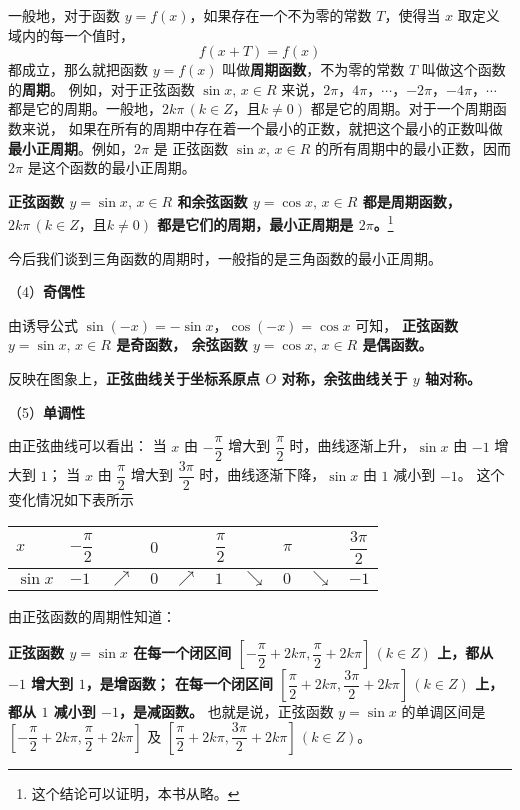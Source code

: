 一般地，对于函数 $y = f(x)$，如果存在一个不为零的常数 $T$，使得当 $x$ 取定义域内的每一个值时，
$$f(x + T) = f(x)$$
都成立，那么就把函数 $y = f(x)$ 叫做\textbf{周期函数}，不为零的常数 $T$ 叫做这个函数的\textbf{周期}。
例如，对于正弦函数 $\sin x, \, x \in R$ 来说，$2\pi$，$4\pi$，$\cdots$，$-2\pi$，$-4\pi$，$\cdots$
都是它的周期。一般地，$2k\pi \, (k \in Z \text{，且} k \neq 0)$ 都是它的周期。对于一个周期函数来说，
如果在所有的周期中存在着一个最小的正数，就把这个最小的正数叫做\textbf{最小正周期}。例如，$2\pi$ 是
正弦函数 $\sin x, \, x \in R$ 的所有周期中的最小正数，因而 $2\pi$ 是这个函数的最小正周期。

\textbf{正弦函数 $y = \sin x, \, x \in R$ 和余弦函数 $y = \cos x, \, x \in R$ 都是周期函数，
$2k\pi \, (k \in Z \text{，且} k \neq 0)$ 都是它们的周期，最小正周期是 $2\pi$。}\footnote{这个结论可以证明，本书从略。}

今后我们谈到三角函数的周期时，一般指的是三角函数的最小正周期。

（4）\textbf{奇偶性} 

由诱导公式 $\sin(-x) = -\sin x$，$\cos(-x) = \cos x$ 可知，\textbf{
正弦函数 $y = \sin x, \, x \in R$ 是奇函数，
余弦函数 $y = \cos x, \, x \in R$ 是偶函数。}

反映在图象上，\textbf{正弦曲线关于坐标系原点 $O$ 对称，余弦曲线关于 $y$ 轴对称。}

（5）\textbf{单调性} 

由正弦曲线可以看出：
当 $x$ 由 $-\dfrac \pi 2$ 增大到 $\dfrac \pi 2$ 时，曲线逐渐上升，$\sin x$ 由 $-1$ 增大到 $1$；
当 $x$ 由 $\dfrac \pi 2$ 增大到 $\dfrac{3\pi} 2$ 时，曲线逐渐下降，$\sin x$ 由 $1$ 减小到 $-1$。
这个变化情况如下表所示

\begin{table}[H]
\renewcommand\arraystretch{2}
\begin{tabular}{|w{c}{5em}|*{9}{w{c}{2em}}|}
    \hline
    $x$ & $-\dfrac \pi 2$ & & $0$ & & $\dfrac \pi 2$ & & $\pi$ & & $\dfrac{3\pi}{2}$ \\ \hline
    $\sin x$ & $-1$ & $\nearrow$ & $0$ & $\nearrow$ & $1$ & $\searrow$ & $0$ & $\searrow$ & $-1$ \\ \hline
\end{tabular}
\end{table}

由正弦函数的周期性知道：

\textbf{正弦函数 $y = \sin x$
在每一个闭区间 $\left[ -\dfrac \pi 2 + 2k\pi,  \dfrac \pi 2 + 2k\pi \right]\, (k \in Z)$ \vspace{0.5em} 上，都从 $-1$ 增大到 $1$，是增函数；
在每一个闭区间 $\left[ \dfrac \pi 2 + 2k\pi,  \dfrac{3\pi} 2 + 2k\pi \right]\, (k \in Z)$ \vspace{0.5em} 上，都从 $1$ 减小到 $-1$，是减函数。}
也就是说，正弦函数 $y = \sin x$ 的单调区间是 $\left[ -\dfrac \pi 2 + 2k\pi,  \dfrac \pi 2 + 2k\pi \right]$
及 $\left[ \dfrac \pi 2 + 2k\pi,  \dfrac{3\pi} 2 + 2k\pi \right]\, (k \in Z)$。\vspace{0.5em}

